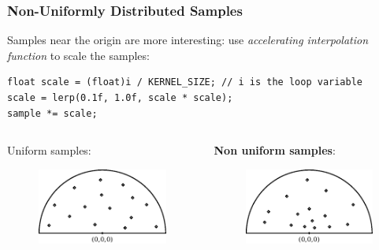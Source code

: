 \documentclass{beamer}
\begin{document}
\begin{frame}[fragile]
\frametitle{Non-Uniformly Distributed Samples}
Samples near the origin are more interesting: use \emph{accelerating interpolation function} to scale the samples:
\begin{verbatim}
float scale = (float)i / KERNEL_SIZE; // i is the loop variable
scale = lerp(0.1f, 1.0f, scale * scale);
sample *= scale;
\end{verbatim}

\vspace{0.3cm}

\begin{columns}
    \begin{column}{0.45\linewidth}
        \centering
        Uniform samples:
        \begin{figure}
            \centering
            \vspace{-1.8ex}%
            \includegraphics[width=0.7\linewidth]{images/sample_kernel_uniform.pdf}
        \end{figure}
    \end{column}
    
    \begin{column}{0.45\linewidth}
        \centering
        \textbf{Non uniform samples}:
        \begin{figure}
            \centering
            \vspace{-1.8ex}%
            \includegraphics[width=0.7\linewidth]{images/sample_kernel_accel.pdf}
        \end{figure}
        
    \end{column}
\end{columns}

\end{frame}
\end{document}
